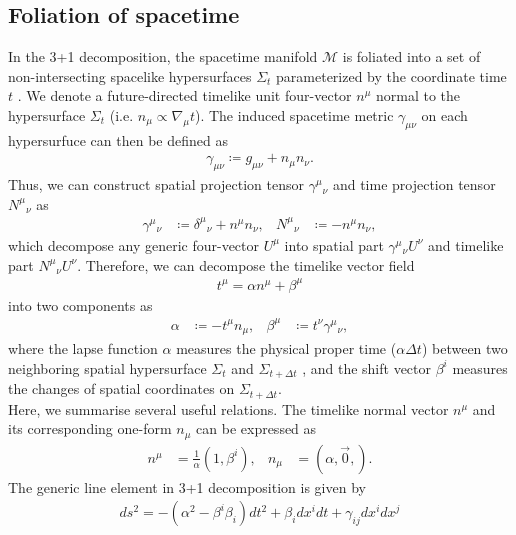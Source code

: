 \subsection{Foliation of spacetime} \label{section1.2.1}

In the 3+1 decomposition, the spacetime manifold $\mathcal{M}$ is foliated into a set of non-intersecting spacelike hypersurfaces $\Sigma_t$ parameterized by the coordinate time $t$ \cite{misner1973gravitation}.
We denote a future-directed timelike unit four-vector $n^\mu$ normal to the hypersurface $\Sigma_t$ (i.e. $n_{\mu} \propto \nabla_\mu t$).
The induced spacetime metric $\gamma_{\mu\nu}$ on each hypersurfuce can then be defined as
\begin{align}\label{eq:1.2.spatial}
    \gamma_{\mu\nu} \coloneqq g_{\mu\nu} + n_{\mu} n_{\nu}.
\end{align}
Thus, we can construct spatial projection tensor $\gamma^{\mu}{}_{\nu}$ and time projection tensor $N^{\mu}{}_{\nu}$ as
\begin{align}
    \gamma^{\mu}{}_{\nu} &\coloneqq \delta^{\mu}{}_{\nu} + n^{\mu} n_{\nu}, & N^{\mu}{}_{\nu} &\coloneqq - n^{\mu} n_{\nu},
\end{align}
which decompose any generic four-vector $U^\mu$ into spatial part $\gamma^{\mu}{}_{\nu}U^{\nu}$ and timelike part $N^{\mu}{}_{\nu}U^{\nu}$.
Therefore, we can decompose the timelike vector field
\begin{align}\label{eq:1.2.1.normal_decompose}
t^\mu = \alpha n^{\mu} + \beta^{\mu}
\end{align}
into two components as
\begin{align}
    \alpha &\coloneqq - t^\mu n_\mu, & \beta^{\mu} &\coloneqq t^{\nu} \gamma^{\mu}{}_{\nu},
\end{align}
where the lapse function $\alpha$ measures the physical proper time ($\alpha\Delta t$) between two neighboring spatial hypersurface $\Sigma_t$ and $\Sigma_{t+\Delta t}$
, and the shift vector $\beta^i$ measures the changes of spatial coordinates on $\Sigma_{t+\Delta t}$.\\
Here, we summarise several useful relations.
The timelike normal vector $n^\mu$ and its corresponding one-form $n_\mu$ can be expressed as
\begin{align} \label{eq:1.2.1.normal}
    n^\mu &= \frac{1}{\alpha}\left(1, \beta^i \right), & n_\mu &= \left(\alpha, \vec{0}, \right).
\end{align}
The generic line element in 3+1 decomposition is given by
\begin{align}
    ds^2 = - \left( \alpha^2 - \beta^i \beta_i \right) dt^2 + \beta_i dx^i dt + \gamma_{ij} dx^i dx^j
\end{align}
